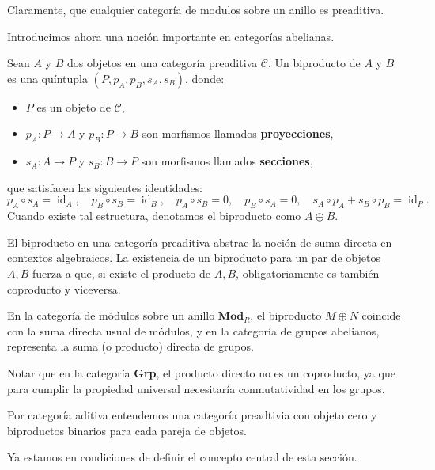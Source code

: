 Claramente, que cualquier categoría de modulos sobre un anillo es preaditiva.

Introducimos ahora una noción importante en categorías abelianas.

\begin{definicion}
    Sean $A$ y $B$ dos objetos en una categoría preaditiva $\mathscr{C}$. Un biproducto de $A$ y $B$ es una quíntupla $(P, p_A, p_B, s_A, s_B)$, donde:
    \begin{itemize}
        \item $P$ es un objeto de $\mathscr{C}$,
        \item $p_A: P \to A$ y $p_B: P \to B$ son morfismos llamados \textbf{proyecciones},
        \item $s_A: A \to P$ y $s_B: B \to P$ son morfismos llamados \textbf{secciones},
    \end{itemize}
    que satisfacen las siguientes identidades:  
    \begin{equation}
        p_A \circ s_A = \operatorname{id}_A, \quad 
        p_B \circ s_B = \operatorname{id}_B, \quad 
        p_A \circ s_B = 0, \quad 
        p_B \circ s_A = 0, \quad 
        s_A \circ p_A + s_B \circ p_B = \operatorname{id}_P.
    \end{equation}
    Cuando existe tal estructura, denotamos el biproducto como $A \oplus B$.
\end{definicion}


El biproducto en una categoría preaditiva abstrae la noción de suma directa en contextos algebraicos. La existencia de un biproducto para un par de objetos $A,B$ fuerza a que, si existe el producto de $A,B$, obligatoriamente es también coproducto y viceversa. 

En la categoría de módulos sobre un anillo $\mathbf{Mod}_R$, el biproducto $M \oplus N$ coincide con la suma directa usual de módulos, y en la categoría de grupos abelianos, representa la suma (o producto) directa de grupos. 

Notar que en la categoría \textbf{Grp}, el producto directo no es un coproducto, ya que para cumplir la propiedad universal necesitaría conmutatividad en los grupos.


\begin{definicion} 
    Por categoría aditiva entendemos una categoría preadtivia con objeto cero y biproductos binarios para cada pareja de objetos.
\end{definicion}

Ya estamos en condiciones de definir el concepto central de esta sección.

